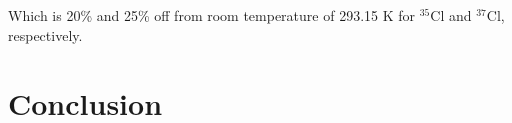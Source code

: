 \documentclass{article}
\begin{document}
Which is 20\% and 25\% off from room temperature of 293.15 K for $^{35} \mathrm{Cl}$ and $^{37} \mathrm{Cl}$, respectively.



























\pagebreak{}

\section{Conclusion}

\pagebreak{}
\end{document}
